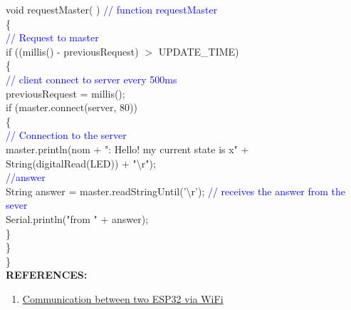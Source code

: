 \documentclass[12pt,a4paper]{article}
\begin{document}
void requestMaster( ) \textcolor{blue}{// function requestMaster }\\
\{\\ \textcolor{blue}{// Request to master}\\
 if ((millis() - previousRequest) $>$ UPDATE\_TIME)\\
\{\\ 
\textcolor{blue}{// client connect to server every 500ms}\\
   previousRequest = millis();\\
   if (master.connect(server, 80))\\ 
\{\\\textcolor{blue}{ // Connection to the server}\\
     master.println(nom + ": Hello! my current state is x" +\\ String(digitalRead(LED)) + "\textbackslash r");\\
     \textcolor{blue}{//answer}\\
     String answer = master.readStringUntil('\textbackslash r');   \textcolor{blue}{// receives the answer from the sever}\\
     Serial.println("from " + answer);\\
   \}\\
 \}\\
\}\\
\vspace{10mm}
\setlength{\parindent}{0eM}
\textbf{\large REFERENCES:}
\vspace{-6mm}
\begin{enumerate}
\setlength\itemsep{-0.3em}
\item  \href {https://www.aranacorp.com/en/communication-between-two-esp32-via-wifi/}{Communication between two ESP32 via WiFi}
\end{enumerate}
\end{document}

